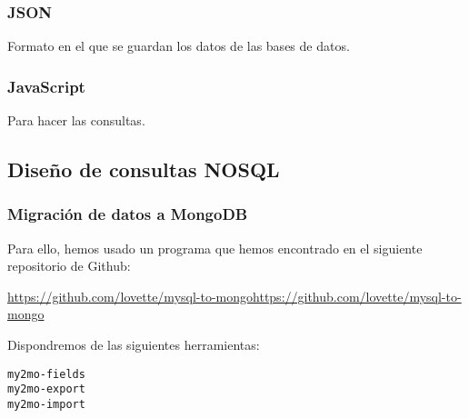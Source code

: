 \documentclass[12pt,a4paper]{article}
\begin{document}
\subsubsection{JSON} \label{pto512}

Formato en el que se guardan los datos de las bases de datos.

\subsubsection{JavaScript}  \label{pto513} 

Para hacer las consultas.


\subsection{Diseño de consultas NOSQL}  \label{pto52}

\subsubsection{Migración de datos a MongoDB} \label{pto521}

Para ello, hemos usado un programa que hemos encontrado en el siguiente repositorio de Github:

\url{https://github.com/lovette/mysql-to-mongohttps://github.com/lovette/mysql-to-mongo}

Dispondremos de las siguientes herramientas:

\begin{verbatim}
my2mo-fields
my2mo-export
my2mo-import
\end{verbatim}
\end{document}
